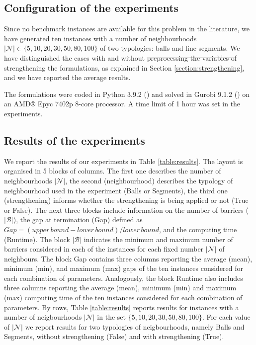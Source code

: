 \documentclass[a4paper,  review, authoryear, 1p.]{elsarticle}
\newcommand{\CV}[1]{{\color{red}#1}}
\begin{document}
	\subsection{Configuration of the experiments}
	Since no benchmark instances are available for this problem in the literature, we have generated ten instances with a number of neighbourhoods $|\mathcal N|\in\{5, 10, 20, 30, 50, 80, 100\}$ of two typologies: balls and line segments. We have distinguished the cases with and without \sout{preprocessing the variables of} \CV{strengthening} the formulations, as explained in Section \ref{section:strengthening}, and we have reported the average results. 
	
	The formulations were coded in Python 3.9.2 (\citet{g_van_rossum_guido_python_1995}) and solved in Gurobi 9.1.2 (\citet{gurobi_optimization_llc_gurobi_2022}) on an AMD® Epyc 7402p 8-core processor. A time limit of 1 hour was set in the experiments.
	
	\subsection{Results of the experiments}
	We report the results of our experiments in Table \ref{table:results}. The layout is organised in 5 blocks of columns. The first one describes the number of neighbourhoods $|\mathcal{N}|$, the second (neighbourhood) describes the typology of neighbourhood used in the experiment (Balls or Segments), the third one (strengthening)  informs whether the strengthening is being applied or not (True or False). The next three blocks include information  on the number of barriers ($|\mathcal{B}|$), the  gap at termination (Gap) defined as $Gap=(upper\, bound - lower\, bound)/lower\, bound$, and the computing time (Runtime). The block $|\mathcal{B}|$ indicates the minimum and maximum number of barriers considered in each of the instances for each fixed number $|\mathcal{N}|$ of neighbours. The block Gap contains three columns reporting the average (mean), minimum (min), and maximum (max) gaps of the ten instances considered for each combination of parameters. Analogously, the block Runtime also includes three columns reporting the average (mean), minimum (min) and maximum (max) computing time of the ten instances considered for each combination of parameters.
	By rows, Table \ref{table:results} reports results for instances with a number of neigbourhoods $|\mathcal{N}|$ in the set $\{5,10,20,30,50,80,100\}$. For each value of $|\mathcal{N}|$  we report results for two typologies of neigbourhoods, namely Balls and Segments, without strengthening (False) and with strengthening (True).
	
\end{document}
